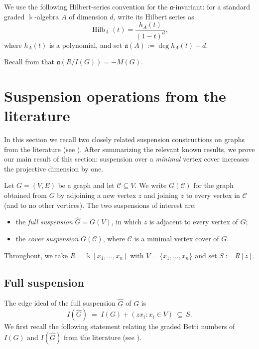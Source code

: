 \documentclass[12pt]{amsart}
\theoremstyle{plain}
\theoremstyle{definition}
\DeclareMathOperator{\Hilb}{Hilb}
\begin{document}
We  use the following Hilbert-series convention for the $\mathfrak a$-invariant: for a standard
graded $\Bbbk$-algebra $A$ of dimension $d$, write its Hilbert series as
\[
\Hilb_A(t) =  \frac{h_A(t)}{(1-t)^d},
\]
where $h_A(t)$ is a polynomial, and set $\mathfrak a(A):=\deg h_A(t)-d$. 

\begin{remark}\label{rem:a_M}
Recall from \cite[Remark 4.5]{biermann2026realizableregdeghpairs} that $\mathfrak a(R/I(G)) =  -M(G)$.
\end{remark}


\section{Suspension operations from the literature}\label{sec:coning-operations}


In this section we recall two closely related suspension constructions on graphs from the literature (see \cite{herzog2011monomial,IndMatch}). After summarizing the relevant known results, we prove our main result of this section: suspension over a \emph{minimal} vertex cover increases the projective dimension by one. 

Let $G=(V,E)$ be a graph and let $\mathcal C\subseteq V$. We write $G(\mathcal C)$ for the graph obtained from $G$ by adjoining a new vertex $z$ and joining $z$ to every vertex in $\mathcal C$ (and to no other vertices). The two suspensions of interest are:
\begin{itemize}
\item the \emph{full suspension} $\widehat{G}=G(V)$, in which $z$ is adjacent to every vertex of $G$;
\item the \emph{cover suspension} $G(\mathcal C)$, where $\mathcal C$ is a minimal vertex cover of $G$.
\end{itemize}
Throughout, we take $R=\Bbbk[x_1,\dots,x_n]$ with $V=\{x_1,\dots,x_n\}$ and set $S:=R[z]$.


\subsection{Full suspension}

The edge ideal of the full suspension $ \widehat{G}$ of $G$ is
\[
I(\widehat{G}) \;=\; I(G) + (zx_i : x_i\in V)\ \subseteq\ S.
\]
We first recall the following statement  relating the graded Betti numbers of $I(G)$ and $I(\widehat{G})$ from the literature  (see \cite[Lemma 3.1]{MousivandProductGraphs}).
\end{document}
